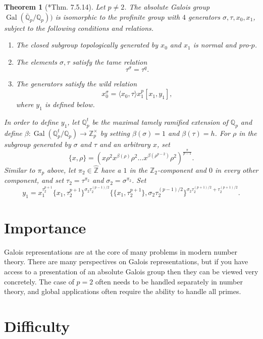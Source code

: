 \documentclass{amsart}
\newcommand{\Q}{\mathbb{Q}}
\newcommand{\Qp}{\mathbb{Q}_p}
\newcommand{\Z}{\mathbb{Z}}
\newcommand{\Zp}{\mathbb{Z}_p}
\newcommand{\hatZ}{\hat{\Z}}
\DeclareMathOperator{\Gal}{Gal}
\newcommand{\GQp}{\Gal(\overline{\Q}_p/\Qp)}
\newtheorem*{theorem}{Theorem}
\begin{document}
\begin{theorem}[{\cite{neukirch-schmidt-wingberg:CohomologyOfNumberFields}*{Thm. 7.5.14}}] \label{thm:GQp_desc}
Let $p \ne 2$.  The absolute Galois group $\GQp)$ is isomorphic to the profinite group with $4$ generators $\sigma, \tau, x_0, x_1$, subject to the following conditions and relations.
\begin{enumerate}
\item The closed subgroup topologically generated by $x_0$ and $x_1$ is normal and pro-$p$.
\item The elements $\sigma, \tau$ satisfy the tame relation
\[
\tau^\sigma = \tau^q.
\]
\item The generators satisfy the wild relation
\[
x_0^\sigma = \langle x_0, \tau \rangle x_1^p [x_1, y_1],
\]
where $y_1$ is defined below.
\end{enumerate}

In order to define $y_1$, let $\Qp^t$ be the maximal tamely ramified extension of $\Qp$ and define
$\beta : \Gal(\Qp^t/\Qp) \to \Zp^\times$ by setting $\beta(\sigma) = 1$ and $\beta(\tau) = h$.
For $\rho$ in the subgroup generated by $\sigma$ and $\tau$ and an arbitrary $x$, set
\[
\{x, \rho\} = (x\rho^2x^{\beta(\rho)}\rho^2\dots x^{\beta(\rho^{p-2})}\rho^2)^{\frac{\pi}{p-1}}.
\]
Similar to $\pi_p$ above, let $\pi_2 \in \hatZ$ have a $1$ in the $\Z_2$-component and $0$ in every other component, and set $\tau_2 = \tau^{\pi_2}$ and $\sigma_2 = \sigma^{\pi_2}$.
Set
\[
y_1 = x_1^{\tau_2^{p+1}}\{x_1, \tau_2^{p+1}\}^{\sigma_2\tau_2^{(p-1)/2}}\{\{x_1, \tau_2^{p+1}\}, \sigma_2\tau_2^{(p-1)/2}\}^{\sigma_2\tau_2^{(p+1)/2}+\tau_2^{(p+1)/2}}.
\]
\end{theorem}

\section{Importance}

Galois representations are at the core of many problems in modern number theory.  There are many perspectives on Galois representations, but if you have access to a presentation of an absolute Galois group then they can be viewed very concretely.  The case of $p=2$ often needs to be handled separately in number theory, and global applications often require the ability to handle all primes.

\section{Difficulty}
\end{document}
